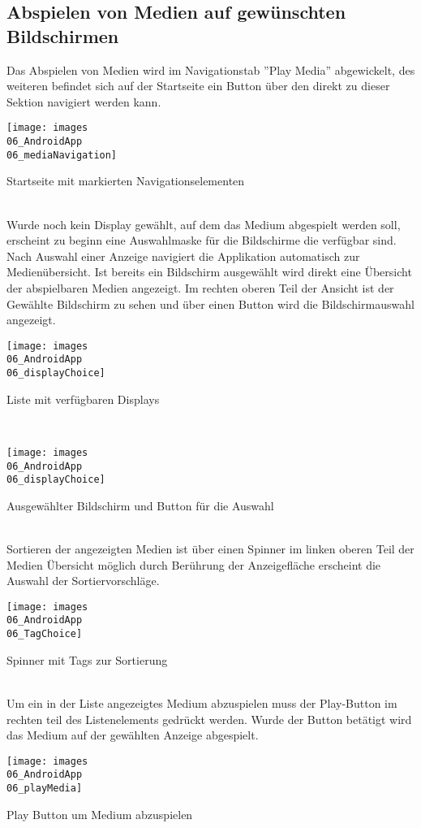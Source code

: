 \subsection{Abspielen von Medien auf gewünschten Bildschirmen}
Das Abspielen von Medien wird im Navigationstab ''Play Media'' abgewickelt, des weiteren befindet sich auf der Startseite ein Button über den direkt zu dieser Sektion navigiert werden kann.
\\
\begin{mediaNav}
\centering
\texttt{[image: images\\06\_AndroidApp\\06\_mediaNavigation]}
\caption{Startseite mit markierten Navigationselementen}
\label{fig:mediaNav}
\end{mediaNav}
\\
Wurde noch kein Display gewählt, auf dem das Medium abgespielt werden soll, erscheint zu beginn eine Auswahlmaske für die Bildschirme die verfügbar sind. Nach Auswahl einer Anzeige navigiert die Applikation automatisch zur Medienübersicht. Ist bereits ein Bildschirm ausgewählt wird direkt eine Übersicht der abspielbaren Medien angezeigt. Im rechten oberen Teil der Ansicht ist der Gewählte Bildschirm zu sehen und über einen Button wird die Bildschirmauswahl angezeigt.
\\
\begin{dispChoi}
\centering
\texttt{[image: images\\06\_AndroidApp\\06\_displayChoice]}
\caption{Liste mit verfügbaren Displays}
\label{fig:mediaNav}
\end{dispChoi}
\\
\begin{dispBut}
\centering
\texttt{[image: images\\06\_AndroidApp\\06\_displayChoice]}
\caption{Ausgewählter Bildschirm und Button für die Auswahl}
\label{fig:mediaNav}
\end{dispBut}
\\
Sortieren der angezeigten Medien ist über einen Spinner im linken oberen Teil der Medien Übersicht möglich durch Berührung der Anzeigefläche erscheint die Auswahl der Sortiervorschläge.
\begin{tagSpinn}
\centering
\texttt{[image: images\\06\_AndroidApp\\06\_TagChoice]}
\caption{Spinner mit Tags zur Sortierung}
\label{fig:mediaNav}
\end{tagSpinn}
\\
Um ein in der Liste angezeigtes Medium abzuspielen muss der Play-Button im rechten teil des Listenelements gedrückt werden. Wurde der Button betätigt wird das Medium auf der gewählten Anzeige abgespielt.
\begin{playBut}
\centering
\texttt{[image: images\\06\_AndroidApp\\06\_playMedia]}
\caption{Play Button um Medium abzuspielen}
\label{fig:mediaNav}
\end{playBut}
\\

